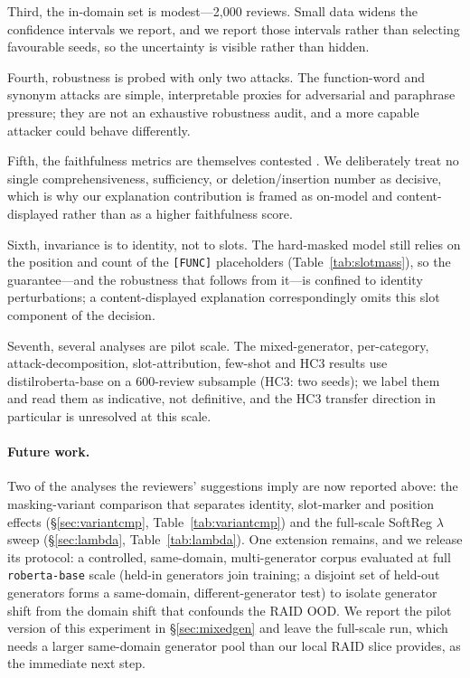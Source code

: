 \documentclass[10pt,twocolumn]{article}
\begin{document}
Third, the in-domain set is modest---2{,}000 reviews. Small data widens the confidence intervals we report, and we report those intervals rather than selecting favourable seeds, so the uncertainty is visible rather than hidden.

Fourth, robustness is probed with only two attacks. The function-word and synonym attacks are simple, interpretable proxies for adversarial and paraphrase pressure; they are not an exhaustive robustness audit, and a more capable attacker could behave differently.

Fifth, the faithfulness metrics are themselves contested \cite{jacovi}. We deliberately treat no single comprehensiveness, sufficiency, or deletion/insertion number as decisive, which is why our explanation contribution is framed as on-model and content-displayed rather than as a higher faithfulness score.

Sixth, invariance is to identity, not to slots. The hard-masked model still relies on the position and count of the \texttt{[FUNC]} placeholders (Table~\ref{tab:slotmass}), so the guarantee---and the robustness that follows from it---is confined to identity perturbations; a content-displayed explanation correspondingly omits this slot component of the decision.

Seventh, several analyses are pilot scale. The mixed-generator, per-category, attack-decomposition, slot-attribution, few-shot and HC3 results use distilroberta-base on a 600-review subsample (HC3: two seeds); we label them and read them as indicative, not definitive, and the HC3 transfer direction in particular is unresolved at this scale.

\paragraph{Future work.} Two of the analyses the reviewers' suggestions imply are now reported above: the masking-variant comparison that separates identity, slot-marker and position effects (\S\ref{sec:variantcmp}, Table~\ref{tab:variantcmp}) and the full-scale SoftReg $\lambda$ sweep (\S\ref{sec:lambda}, Table~\ref{tab:lambda}). One extension remains, and we release its protocol: a controlled, same-domain, multi-generator corpus evaluated at full \texttt{roberta-base} scale (held-in generators join training; a disjoint set of held-out generators forms a same-domain, different-generator test) to isolate generator shift from the domain shift that confounds the RAID OOD. We report the pilot version of this experiment in \S\ref{sec:mixedgen} and leave the full-scale run, which needs a larger same-domain generator pool than our local RAID slice provides, as the immediate next step.
\end{document}
